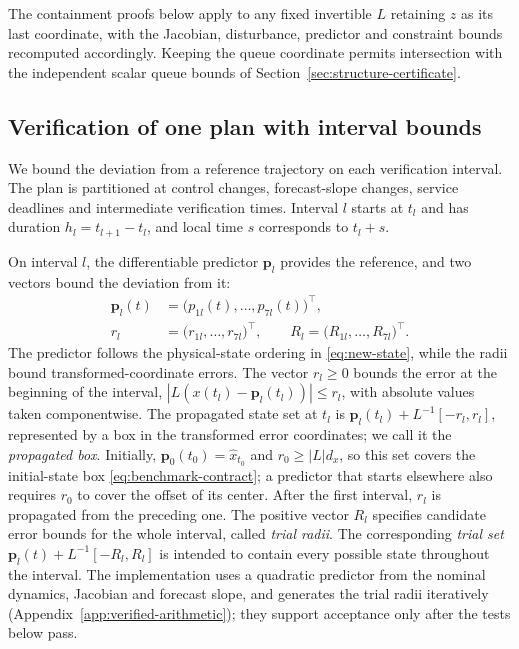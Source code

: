 \documentclass[final]{cas-sc}
\theoremstyle{definition}
\theoremstyle{plain}
\theoremstyle{definition}
\theoremstyle{plain}
\newcommand{\appref}[1]{Appendix~\ref{#1}}
\begin{document}
The containment proofs below apply to any fixed invertible $L$
retaining $z$ as its last coordinate, with the Jacobian, disturbance,
predictor and constraint bounds recomputed accordingly. Keeping the
queue coordinate permits intersection with the independent scalar queue
bounds of Section~\ref{sec:structure-certificate}.

\subsection{Verification of one plan with interval bounds}
\label{app:new-enclosure-proof}

We bound the deviation from a reference trajectory on each verification
interval. The plan is partitioned at control changes, forecast-slope
changes, service deadlines and intermediate verification times.
Interval $l$ starts at $t_l$ and has duration $h_l=t_{l+1}-t_l$, and
local time $s$ corresponds to $t_l+s$.

On interval $l$, the differentiable predictor $\mathbf p_l$ provides
the reference, and two vectors bound the deviation from it:
\[
\begin{aligned}
\mathbf p_l(t)&=\big(p_{1l}(t),\ldots,p_{7l}(t)\big)^\top ,\\
r_l&=\big(r_{1l},\ldots,r_{7l}\big)^\top ,\qquad
R_l=\big(R_{1l},\ldots,R_{7l}\big)^\top .
\end{aligned}
\]
The predictor follows the physical-state ordering in
\eqref{eq:new-state}, while the radii bound
transformed-coordinate errors. The vector $r_l\ge0$ bounds the error at
the beginning of the interval,
$|L(x(t_l)-\mathbf p_l(t_l))|\le r_l$, with absolute values taken
componentwise. The propagated state set at $t_l$ is
$\mathbf p_l(t_l)+L^{-1}[-r_l,r_l]$, represented by a box in the
transformed error coordinates; we call it the \emph{propagated box}.
Initially, $\mathbf p_0(t_0)=\widehat x_{t_0}$ and $r_0\ge|L|d_x$, so
this set covers the initial-state box
\eqref{eq:benchmark-contract}; a predictor that starts elsewhere also
requires $r_0$ to cover the offset of its center. After the first
interval, $r_l$ is propagated from the preceding one. The positive vector $R_l$ specifies candidate error
bounds for the whole interval, called \emph{trial radii}. The
corresponding \emph{trial set}
$\mathbf p_l(t)+L^{-1}[-R_l,R_l]$ is intended to contain every possible
state throughout the interval. The implementation uses a quadratic
predictor from the nominal dynamics, Jacobian and forecast slope, and
generates the trial radii iteratively
(\appref{app:verified-arithmetic}); they support acceptance only after
the tests below pass.
\end{document}
